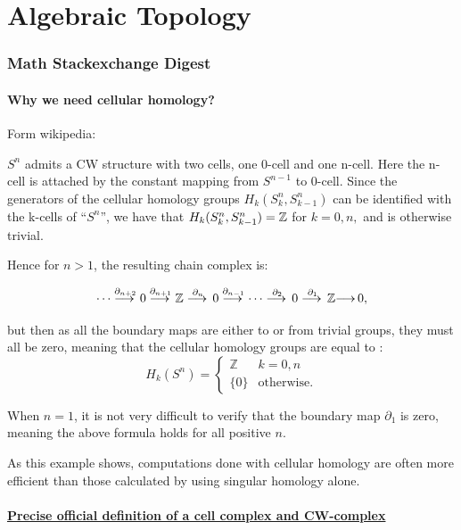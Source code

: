 \part{Algebraic Topology}

\section{Math Stackexchange Digest}

\subsection{Why we need cellular homology?} Form wikipedia:

$S^n$ admits a CW structure with two cells, one 0-cell and one n-cell. Here the n-cell is attached by the constant mapping from $S^{n-1}$ to 0-cell. Since the generators of the cellular homology groups ${H_{k}}(S^n_{k},S^{n}_{k - 1})$ can be identified with the k-cells of ``$S^n$'', we have that ${H_{k}}(S^n_{k},S^{n}_{k - 1})=\mathbb{Z}$ for $k = 0, n,$ and is otherwise trivial.

Hence for $n>1$, the resulting chain complex is:

\[\dotsb\overset{\partial_{n+2}}{\longrightarrow\,}0
\overset{\partial_{n+1}}{\longrightarrow\,}\mathbb{Z}
\overset{\partial_n}{\longrightarrow\,}0
\overset{\partial_{n-1}}{\longrightarrow\,}
\dotsb
\overset{\partial_2}{\longrightarrow\,}
0
\overset{\partial_1}{\longrightarrow\,}
\mathbb{Z} {\longrightarrow\,}
0,\]

but then as all the boundary maps are either to or from trivial groups, they must all be zero, meaning that the cellular homology groups are equal to
:
\[H_k(S^n) = \begin{cases} \mathbb Z & k=0, n \\ \{0\} & \text{otherwise.} \end{cases}\]

When $n=1$, it is not very difficult to verify that the boundary map $\partial_1$ is zero, meaning the above formula holds for all positive $n$.

As this example shows, computations done with cellular homology are often more efficient than those calculated by using singular homology alone.

\subsection{\href{https://math.stackexchange.com/questions/42005}{Precise official definition of a cell complex and CW-complex}}


